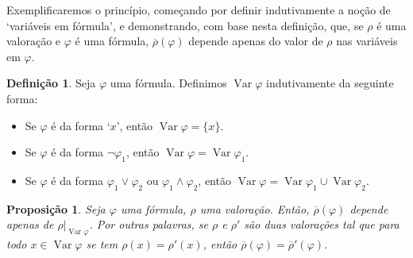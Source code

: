 \documentclass{report}
\newtheorem*{prop*}{Proposição}
\theoremstyle{definition}
\newtheorem*{definicao*}{Definição}
\theoremstyle{remark}
\DeclareMathOperator{\var}{Var}
\begin{document}
	Exemplificaremos o princípio, começando por definir indutivamente a noção de `variáveis em fórmula', e demonstrando, com base nesta definição, que, se $\rho$ é uma valoração e $\varphi$ é uma fórmula, $\overline\rho(\varphi)$ depende apenas do valor de $\rho$ nas variáveis em $\varphi$.
	
	\begin{definicao*}
	Seja $\varphi$ uma fórmula. Definimos $\var \varphi$ indutivamente da seguinte forma:
	\begin{itemize}
	\item Se $\varphi$ é da forma `$x$', então $\var \varphi = \{x\}$.
	
	\item Se $\varphi$ é da forma $\neg \varphi_1$, então $\var \varphi = \var \varphi_1$.
	
	\item Se $\varphi$ é da forma $\varphi_1 \lor \varphi_2$ ou $\varphi_1 \land \varphi_2$, então $\var \varphi = \var \varphi_1 \cup \var \varphi_2$.
	\end{itemize}
	\end{definicao*}
	
	\begin{prop*}
	Seja $\varphi$ uma fórmula, $\rho$ uma valoração. Então, $\overline \rho(\varphi)$ depende apenas de $\rho|_{\var \varphi}$. Por outras palavras, se $\rho$ e $\rho'$ são duas valorações tal que para todo $x \in \var \varphi$ se tem $\rho(x) = \rho'(x)$, então $\overline \rho(\varphi) = \overline \rho'(\varphi)$.
	\end{prop*}
	
\end{document}
